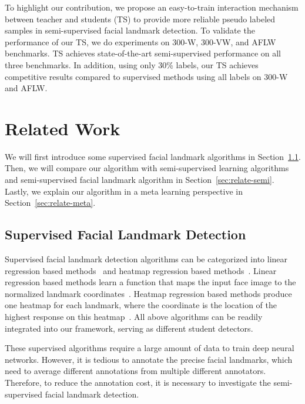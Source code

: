 \documentclass[10pt,twocolumn,letterpaper]{article}
\def\Secref#1{Section~\ref{#1}}
\begin{document}
To highlight our contribution, we propose an easy-to-train interaction mechanism between teacher and students (TS) to provide more reliable pseudo labeled samples in semi-supervised facial landmark detection.
To validate the performance of our TS, we do experiments on 300-W, 300-VW, and AFLW benchmarks.
TS achieves state-of-the-art semi-supervised performance on all three benchmarks. 
In addition, using only 30\% labels, our TS achieves competitive results compared to supervised methods using all labels on 300-W and AFLW.








\section{Related Work}\label{sec:related-work}

We will first introduce some supervised facial landmark algorithms in \Secref{sec:relate-supervised}.
Then, we will compare our algorithm with semi-supervised learning algorithms and semi-supervised facial landmark algorithm in \Secref{sec:relate-semi}.
Lastly, we explain our algorithm in a meta learning perspective in \Secref{sec:relate-meta}.

\subsection{Supervised Facial Landmark Detection}\label{sec:relate-supervised}

Supervised facial landmark detection algorithms can be categorized into linear regression based methods~\cite{xiong2013supervised,cao2014face} and heatmap regression based methods~\cite{wei2016convolutional,dong2018sbr,dong2018san,newell2016stacked}.
Linear regression based methods learn a function that maps the input face image to the normalized landmark coordinates~\cite{xiong2013supervised,cao2014face}.
Heatmap regression based methods produce one heatmap for each landmark, where the coordinate is the location of the highest response on this heatmap~\cite{wei2016convolutional,dong2018sbr,dong2018san,newell2016stacked,bulat2016convolutional}.
All above algorithms can be readily integrated into our framework, serving as different student detectors.

These supervised algorithms require a large amount of data to train deep neural networks. However, it is tedious to annotate the precise facial landmarks, which need to average different annotations from multiple different annotators. Therefore, to reduce the annotation cost, it is necessary to investigate the semi-supervised facial landmark detection.
\end{document}
